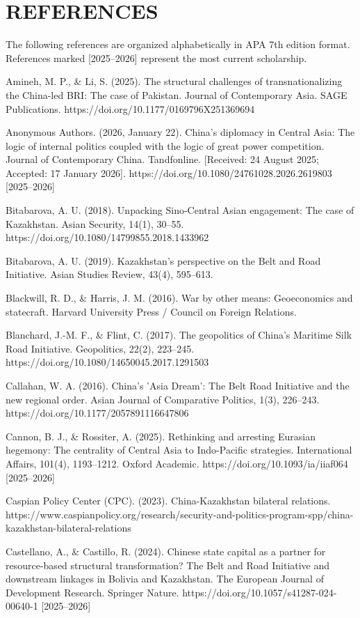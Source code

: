 \documentclass[12pt]{article}
\begin{document}
\section{REFERENCES}
The following references are organized alphabetically in APA 7th edition format. References marked [2025--2026] represent the most current scholarship.\par

Amineh, M. P., \& Li, S. (2025). The structural challenges of transnationalizing the China-led BRI: The case of Pakistan. Journal of Contemporary Asia. SAGE Publications. https://doi.org/10.1177/0169796X251369694\par
Anonymous Authors. (2026, January 22). China's diplomacy in Central Asia: The logic of internal politics coupled with the logic of great power competition. Journal of Contemporary China. Tandfonline. [Received: 24 August 2025; Accepted: 17 January 2026]. https://doi.org/10.1080/24761028.2026.2619803 [2025--2026]\par
Bitabarova, A. U. (2018). Unpacking Sino-Central Asian engagement: The case of Kazakhstan. Asian Security, 14(1), 30--55. https://doi.org/10.1080/14799855.2018.1433962\par
Bitabarova, A. U. (2019). Kazakhstan's perspective on the Belt and Road Initiative. Asian Studies Review, 43(4), 595--613.\par
Blackwill, R. D., \& Harris, J. M. (2016). War by other means: Geoeconomics and statecraft. Harvard University Press / Council on Foreign Relations.\par
Blanchard, J.-M. F., \& Flint, C. (2017). The geopolitics of China's Maritime Silk Road Initiative. Geopolitics, 22(2), 223--245. https://doi.org/10.1080/14650045.2017.1291503\par
Callahan, W. A. (2016). China's 'Asia Dream': The Belt Road Initiative and the new regional order. Asian Journal of Comparative Politics, 1(3), 226--243. https://doi.org/10.1177/2057891116647806\par
Cannon, B. J., \& Rossiter, A. (2025). Rethinking and arresting Eurasian hegemony: The centrality of Central Asia to Indo-Pacific strategies. International Affairs, 101(4), 1193--1212. Oxford Academic. https://doi.org/10.1093/ia/iiaf064 [2025--2026]\par
Caspian Policy Center (CPC). (2023). China-Kazakhstan bilateral relations. https://www.caspianpolicy.org/research/security-and-politics-program-spp/china-kazakhstan-bilateral-relations\par
Castellano, A., \& Castillo, R. (2024). Chinese state capital as a partner for resource-based structural transformation? The Belt and Road Initiative and downstream linkages in Bolivia and Kazakhstan. The European Journal of Development Research. Springer Nature. https://doi.org/10.1057/s41287-024-00640-1 [2025--2026]\par
\end{document}
